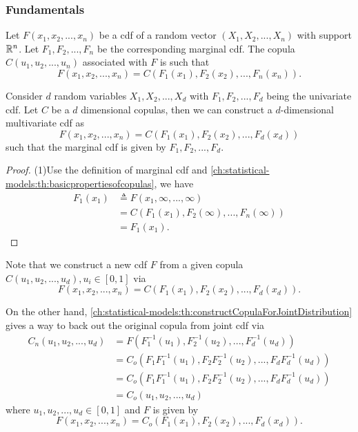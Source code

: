 \begin{refsection}
\subsubsection{Fundamentals}
\begin{definition}\cite[3]{Ruschendorf2013mathematical}
Let $F(x_1,x_2,...,x_n)$ be a cdf of a random vector $(X_1,X_2,...,X_n)$ with support $\mathbb{R}^n$. Let $F_1,F_2, ...,F_n$ be the corresponding marginal cdf. The copula $C(u_1,u_2,...,u_n)$ associated with $F$ is such that 
$$F(x_1,x_2,...,x_n) = C(F_1(x_1),F_2(x_2),...,F_n(x_n)).$$	
\end{definition}




\begin{theorem}\label{ch:statistical-models:th:ConstructMultivariateDistributionFromCopulaAndMargins}
	Consider $d$ random variables $X_1,X_2,...,X_d$ with $F_1,F_2,...,F_d$ being the univariate cdf. Let $C$ be a $d$ dimensional copulas, then we can construct a $d$-dimensional multivariate cdf as
	$$F(x_1,x_2,...,x_n) = C(F_1(x_1),F_2(x_2),...,F_d(x_d))$$
	such that the marginal cdf is given by $F_1,F_2,...,F_d$.
\end{theorem}
\begin{proof}
(1)Use the definition of marginal cdf and \autoref{ch:statistical-models:th:basicpropertiesofcopulas}, we have
\begin{align*}
F_1(x_1) &\triangleq F(x_1,\infty,...,\infty) \\
&=C(F_1(x_1),F_2(\infty),...,F_n(\infty)) \\
&=F_1(x_1).
\end{align*}
\end{proof}

\begin{remark}
Note that we construct a new cdf $F$ from a given copula $C(u_1,u_2,...,u_d),u_i\in [0,1]$ via
$$F(x_1,x_2,...,x_n) = C(F_1(x_1),F_2(x_2),...,F_d(x_d)).$$

On the other hand, \autoref{ch:statistical-models:th:constructCopulaForJointDistribution} gives a way to back out the original copula from joint cdf via
\begin{align*}
C_n(u_1,u_2,...,u_d) &= F(F_1^{-1}(u_1),F_2^{-1}(u_2),..., F_d^{-1}(u_d)) \\
&=C_o(F_1F_1^{-1}(u_1),F_2F_2^{-1}(u_2),..., F_dF_d^{-1}(u_d)) \\
&=C_o(F_1F_1^{-1}(u_1),F_2F_2^{-1}(u_2),..., F_dF_d^{-1}(u_d)) \\
&=C_o(u_1,u_2,...,u_d)
\end{align*}
where $u_1,u_2,...,u_d\in [0,1]$ and 
$F$ is given by
$$F(x_1,x_2,...,x_n) = C_o(F_1(x_1),F_2(x_2),...,F_d(x_d)).$$	
\end{remark}


\end{refsection}
